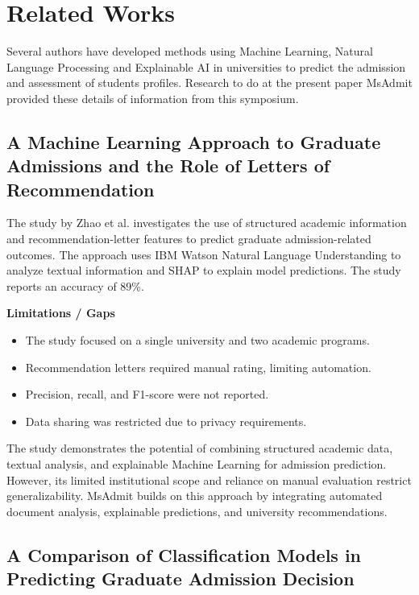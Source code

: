 \section{Related Works}

Several authors have developed methods using Machine Learning, Natural Language Processing and Explainable AI in universities to predict the admission and assessment of students profiles. Research to do at the present paper MsAdmit provided these details of information from this symposium.


\subsection{A Machine Learning Approach to Graduate Admissions and the Role of Letters of Recommendation}

The study by Zhao et al. \cite{zhao2023} investigates the use of
structured academic information and recommendation-letter features
to predict graduate admission-related outcomes. The approach uses
IBM Watson Natural Language Understanding to analyze textual
information and SHAP to explain model predictions. The study reports
an accuracy of 89\%.

\noindent\textbf{Limitations / Gaps}
\begin{itemize}
    \item The study focused on a single university and two academic programs.
    \item Recommendation letters required manual rating, limiting automation.
    \item Precision, recall, and F1-score were not reported.
    \item Data sharing was restricted due to privacy requirements.
\end{itemize}

The study demonstrates the potential of combining structured academic
data, textual analysis, and explainable Machine Learning for admission
prediction. However, its limited institutional scope and reliance on
manual evaluation restrict generalizability. MsAdmit builds on this
approach by integrating automated document analysis, explainable
predictions, and university recommendations.

\subsection{A Comparison of Classification Models in Predicting Graduate Admission Decision}

